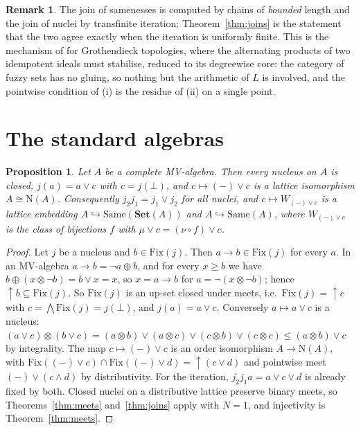 \documentclass[11pt]{amsart}
\newtheorem{prop}[thm]{Proposition}
\theoremstyle{definition}
\newtheorem{rem}[thm]{Remark}
\newcommand{\Fix}{\mathrm{Fix}}
\newcommand{\Nuc}{\mathrm{N}}
\newcommand{\Same}{\mathrm{Same}}
\newcommand{\FSet}{\mathbf{Set}}
\begin{document}
\begin{rem}
The join of samenesses is computed by chains of \emph{bounded} length and
the join of nuclei by transfinite iteration; Theorem~\ref{thm:joins} is the
statement that the two agree exactly when the iteration is uniformly
finite. This is the mechanism of \cite{Topjoin,Finitejoin} for Grothendieck
topologies, where the alternating products of two idempotent ideals must
stabilise, reduced to its degreewise core: the category of fuzzy sets has
no gluing, so nothing but the arithmetic of $L$ is involved, and the
pointwise condition of (i) is the residue of (ii) on a single point.
\end{rem}

\section{The standard algebras}\label{sec:std}

\begin{prop}\label{prop:mv}
Let $A$ be a complete MV-algebra. Then every nucleus on $A$ is closed,
$j(a)=a\vee c$ with $c=j(\bot)$, and $c\mapsto(-)\vee c$ is a lattice
isomorphism $A\cong\Nuc(A)$. Consequently $j_2j_1=j_1\vee j_2$ for all
nuclei, and $c\mapsto W_{(-)\vee c}$ is a lattice embedding
$A\hookrightarrow\Same(\FSet(A))$ and $A\hookrightarrow\Same(A)$, where
$W_{(-)\vee c}$ is the class of bijections $f$ with
$\mu\vee c=(\nu\circ f)\vee c$.
\end{prop}
\begin{proof}
Let $j$ be a nucleus and $b\in\Fix(j)$. Then $a\to b\in\Fix(j)$ for every
$a$. In an MV-algebra $a\to b=\neg a\oplus b$, and for every $x\ge b$ we have
$b\oplus(x\otimes\neg b)=b\vee x=x$, so $x=a\to b$ for $a=\neg(x\otimes\neg
b)$; hence $\uparrow\!b\subseteq\Fix(j)$. So $\Fix(j)$ is an up-set closed
under meets, i.e.\ $\Fix(j)=\uparrow\!c$ with $c=\bigwedge\Fix(j)=j(\bot)$,
and $j(a)=a\vee c$. Conversely $a\mapsto a\vee c$ is a nucleus:
$(a\vee c)\otimes(b\vee c)=(a\otimes b)\vee(a\otimes c)\vee(c\otimes b)\vee
(c\otimes c)\le(a\otimes b)\vee c$ by integrality. The map $c\mapsto(-)\vee c$
is an order isomorphism $A\to\Nuc(A)$, with
$\Fix((-)\vee c)\cap\Fix((-)\vee d)=\uparrow\!(c\vee d)$ and pointwise meet
$(-)\vee(c\wedge d)$ by distributivity. For the iteration, $j_2j_1a=a\vee c
\vee d$ is already fixed by both. Closed nuclei on a distributive lattice
preserve binary meets, so Theorems~\ref{thm:meets} and~\ref{thm:joins}
apply with $N=1$, and injectivity is Theorem~\ref{thm:meets}.
\end{proof}
\end{document}
